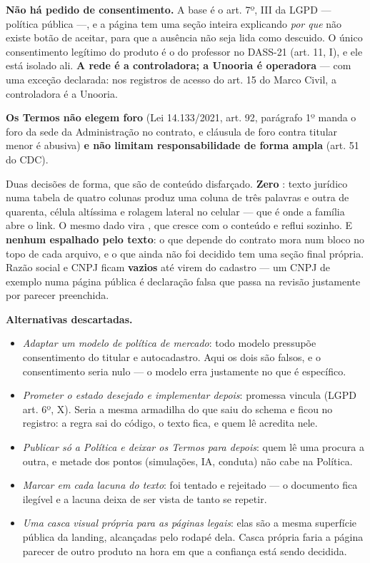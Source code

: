 \textbf{Não há pedido de consentimento.} A base é o art. 7º, III da LGPD ---
política pública ---, e a página tem uma seção inteira explicando \emph{por que}
não existe botão de aceitar, para que a ausência não seja lida como descuido. O
único consentimento legítimo do produto é o do professor no DASS-21
(art. 11, I), e ele está isolado ali. \textbf{A rede é a controladora; a Unooria
é operadora} --- com uma exceção declarada: nos registros de acesso do art. 15
do Marco Civil, a controladora é a Unooria.

\textbf{Os Termos não elegem foro} (Lei 14.133/2021, art. 92, parágrafo 1º manda o foro
da sede da Administração no contrato, e cláusula de foro contra titular menor é
abusiva) \textbf{e não limitam responsabilidade de forma ampla} (art. 51 do CDC).

Duas decisões de forma, que são de conteúdo disfarçado. \textbf{Zero
}: texto jurídico numa tabela de quatro colunas produz uma coluna de
três palavras e outra de quarenta, célula altíssima e rolagem lateral no
celular --- que é onde a família abre o link. O mesmo dado vira ,
que cresce com o conteúdo e reflui sozinho. E \textbf{nenhum \cd{[A DEFINIR]}
espalhado pelo texto}: o que depende do contrato mora num bloco
 no topo de cada arquivo, e o que ainda não foi decidido tem
uma seção final própria. Razão social e CNPJ ficam \textbf{vazios} até virem do
cadastro --- um CNPJ de exemplo numa página pública é declaração falsa que passa
na revisão justamente por parecer preenchida.

\textbf{Alternativas descartadas.}
\begin{itemize}
  \item \emph{Adaptar um modelo de política de mercado}: todo modelo pressupõe
    consentimento do titular e autocadastro. Aqui os dois são falsos, e o
    consentimento seria nulo --- o modelo erra justamente no que é específico.
  \item \emph{Prometer o estado desejado e implementar depois}: promessa vincula
    (LGPD art. 6º, X). Seria a mesma armadilha do  que saiu do
    schema e ficou no registro: a regra sai do código, o texto fica, e quem lê
    acredita nele.
  \item \emph{Publicar só a Política e deixar os Termos para depois}: quem lê uma
    procura a outra, e metade dos pontos (simulações, IA, conduta) não cabe na
    Política.
  \item \emph{Marcar \cd{[A DEFINIR]} em cada lacuna do texto}: foi tentado e
    rejeitado --- o documento fica ilegível e a lacuna deixa de ser vista de
    tanto se repetir.
  \item \emph{Uma casca visual própria para as páginas legais}: elas são a mesma
    superfície pública da landing, alcançadas pelo rodapé dela. Casca própria
    faria a página parecer de outro produto na hora em que a confiança está
    sendo decidida.
\end{itemize}

